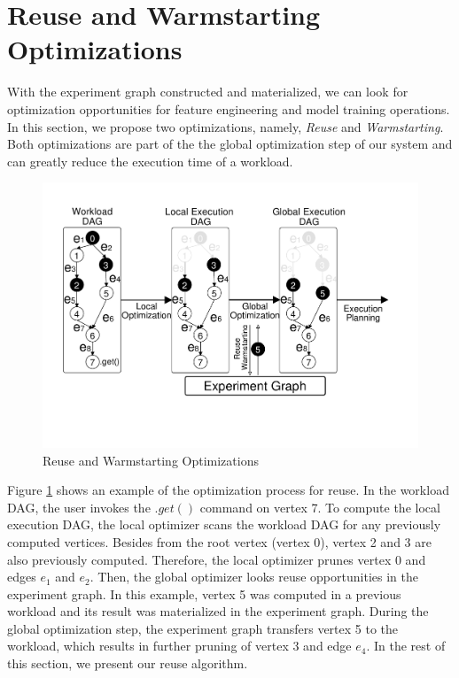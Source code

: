 \section{Reuse and Warmstarting Optimizations}\label{sec-reuse-and-warmstarting}
With the experiment graph constructed and materialized, we can look for optimization opportunities for feature engineering and model training operations.
In this section, we propose two optimizations, namely, \textit{Reuse} and \textit{Warmstarting}.
Both optimizations are part of the the global optimization step of our system and can greatly reduce the execution time of a workload.

\begin{figure}
\centering
\includegraphics[width=\columnwidth]{../images/reuse-optimization}
\caption{Reuse and Warmstarting Optimizations}
\label{global-optimization}
\end{figure}
Figure \ref{global-optimization} shows an example of the optimization process for reuse.
In the workload DAG, the user invokes the $.get()$ command on vertex 7.
To compute the local execution DAG, the local optimizer scans the workload DAG for any previously computed vertices.
Besides from the root vertex (vertex 0), vertex 2 and 3 are also previously computed.
Therefore, the local optimizer prunes vertex 0 and edges $e_1$ and $e_2$.
Then, the global optimizer looks reuse opportunities in the experiment graph.
In this example, vertex 5 was computed in a previous workload and its result was materialized in the experiment graph.
During the global optimization step, the experiment graph transfers vertex 5 to the workload, which results in further pruning of vertex 3 and edge $e_4$.
In the rest of this section, we present our reuse algorithm.

